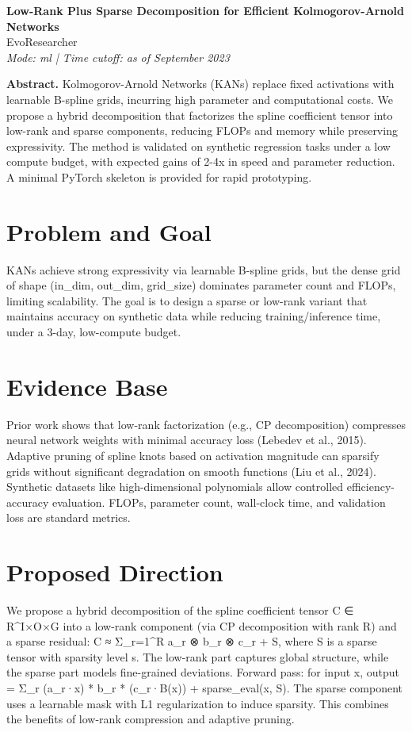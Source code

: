 \documentclass[10pt]{article}
\begin{document}
\begin{center}
{\Large \textbf{Low-Rank Plus Sparse Decomposition for Efficient Kolmogorov-Arnold Networks}}\\
EvoResearcher\\
\textit{Mode: ml | Time cutoff: as of September 2023}
\end{center}

\textbf{Abstract.} Kolmogorov-Arnold Networks (KANs) replace fixed activations with learnable B-spline grids, incurring high parameter and computational costs. We propose a hybrid decomposition that factorizes the spline coefficient tensor into low-rank and sparse components, reducing FLOPs and memory while preserving expressivity. The method is validated on synthetic regression tasks under a low compute budget, with expected gains of 2-4x in speed and parameter reduction. A minimal PyTorch skeleton is provided for rapid prototyping.

\section*{Problem and Goal}
KANs achieve strong expressivity via learnable B-spline grids, but the dense grid of shape (in_dim, out_dim, grid_size) dominates parameter count and FLOPs, limiting scalability. The goal is to design a sparse or low-rank variant that maintains accuracy on synthetic data while reducing training/inference time, under a 3-day, low-compute budget.

\section*{Evidence Base}
Prior work shows that low-rank factorization (e.g., CP decomposition) compresses neural network weights with minimal accuracy loss (Lebedev et al., 2015). Adaptive pruning of spline knots based on activation magnitude can sparsify grids without significant degradation on smooth functions (Liu et al., 2024). Synthetic datasets like high-dimensional polynomials allow controlled efficiency-accuracy evaluation. FLOPs, parameter count, wall-clock time, and validation loss are standard metrics.

\section*{Proposed Direction}
We propose a hybrid decomposition of the spline coefficient tensor C ∈ R^{I×O×G} into a low-rank component (via CP decomposition with rank R) and a sparse residual: C ≈ Σ_{r=1}^R a_r ⊗ b_r ⊗ c_r + S, where S is a sparse tensor with sparsity level s. The low-rank part captures global structure, while the sparse part models fine-grained deviations. Forward pass: for input x, output = Σ_r (a_r·x) * b_r * (c_r·B(x)) + sparse_eval(x, S). The sparse component uses a learnable mask with L1 regularization to induce sparsity. This combines the benefits of low-rank compression and adaptive pruning.
\end{document}

